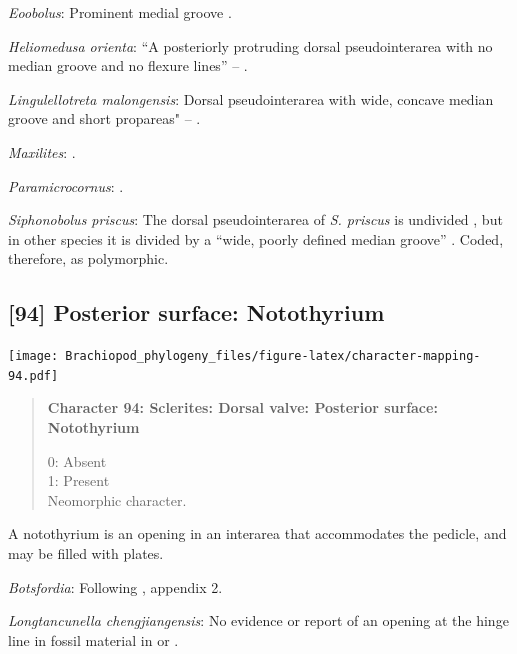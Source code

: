 \documentclass[openany]{book}
\begin{document}
\hypertarget{Eoobolus-coding-93}{}
\emph{Eoobolus}: Prominent medial groove
\citep{Balthasar2009Thebrachiopod}.

\hypertarget{Heliomedusa_orienta-coding-93}{}
\emph{Heliomedusa orienta}: ``A posteriorly protruding dorsal
pseudointerarea with no median groove and no flexure lines'' --
\citet{Chen2007Reinterpretationof}.

\hypertarget{Lingulellotreta_malongensis-coding-93}{}
\emph{Lingulellotreta malongensis}: Dorsal pseudointerarea with wide,
concave median groove and short propareas" --
\citet{Williams2000LinguliformeaCraniiformea}.

\hypertarget{Maxilites-coding-93}{}
\emph{Maxilites}: \citet{Marek1972}.

\hypertarget{Paramicrocornus-coding-93}{}
\emph{Paramicrocornus}: \citet{Zhang2018Ahyolithid}.

\hypertarget{Siphonobolus_priscus-coding-93}{}
\emph{Siphonobolus priscus}: The dorsal pseudointerarea of \emph{S.
priscus} is undivided \citep{Popov2009Earlyontogeny}, but in other
species it is divided by a ``wide, poorly defined median groove''
\citep{Williams2000LinguliformeaCraniiformea}. Coded, therefore, as
polymorphic.

\subsection*{{[}94{]} Posterior surface:
Notothyrium}\label{posterior-surface-notothyrium}

\texttt{[image: Brachiopod\_phylogeny\_files/figure-latex/character-mapping-94.pdf]}

\begin{quote}
\textbf{Character 94: Sclerites: Dorsal valve: Posterior surface:
Notothyrium}

0: Absent\\
1: Present\\
Neomorphic character.
\end{quote}

A notothyrium is an opening in an interarea that accommodates the
pedicle, and may be filled with plates.

\hypertarget{Botsfordia-coding-94}{}
\emph{Botsfordia}: Following \citet{Williams1998Thediversity}, appendix
2.

\hypertarget{Longtancunella_chengjiangensis-coding-94}{}
\emph{Longtancunella chengjiangensis}: No evidence or report of an
opening at the hinge line in fossil material in
\citet{Zhang2007Agregarious} or \citet{Zhang2011Theexceptionally}.
\end{document}
